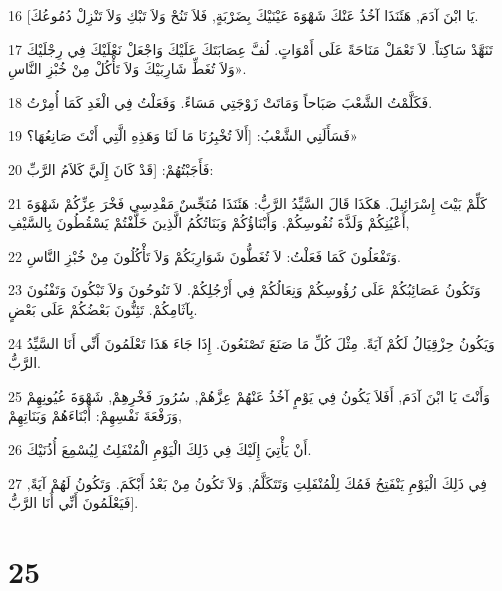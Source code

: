 \par 16 [يَا ابْنَ آدَمَ, هَئَنَذَا آخُذُ عَنْكَ شَهْوَةَ عَيْنَيْكَ بِضَرْبَةٍ, فَلاَ تَنُحْ وَلاَ تَبْكِ وَلاَ تَنْزِلْ دُمُوعُكَ.
\par 17 تَنَهَّدْ سَاكِتاً. لاَ تَعْمَلْ مَنَاحَةً عَلَى أَمْوَاتٍ. لُفَّ عِصَابَتَكَ عَلَيْكَ وَاجْعَلْ نَعْلَيْكَ فِي رِجْلَيْكَ وَلاَ تُغَطِّ شَارِبَيْكَ وَلاَ تَأْكُلْ مِنْ خُبْزِ النَّاسِ».
\par 18 فَكَلَّمْتُ الشَّعْبَ صَبَاحاً وَمَاتَتْ زَوْجَتِي مَسَاءً. وَفَعَلْتُ فِي الْغَدِ كَمَا أُمِرْتُ.
\par 19 فَسَأَلَنِي الشَّعْبُ: [أَلاَ تُخْبِرُنَا مَا لَنَا وَهَذِهِ الَّتِي أَنْتَ صَانِعُهَا؟»
\par 20 فَأَجَبْتُهُمْ: [قَدْ كَانَ إِلَيَّ كَلاَمُ الرَّبِّ:
\par 21 كَلِّمْ بَيْتَ إِسْرَائِيلَ. هَكَذَا قَالَ السَّيِّدُ الرَّبُّ: هَئَنَذَا مُنَجِّسٌ مَقْدِسِي فَخْرَ عِزِّكُمْ شَهْوَةَ أَعْيُنِكُمْ وَلَذَّةَ نُفُوسِكُمْ. وَأَبْنَاؤُكُمْ وَبَنَاتُكُمُ الَّذِينَ خَلَّفْتُمْ يَسْقُطُونَ بِالسَّيْفِ,
\par 22 وَتَفْعَلُونَ كَمَا فَعَلْتُ: لاَ تُغَطُّونَ شَوَارِبَكُمْ وَلاَ تَأْكُلُونَ مِنْ خُبْزِ النَّاسِ.
\par 23 وَتَكُونُ عَصَائِبُكُمْ عَلَى رُؤُوسِكُمْ وَنِعَالُكُمْ فِي أَرْجُلِكُمْ. لاَ تَنُوحُونَ وَلاَ تَبْكُونَ وَتَفْنُونَ بِآثَامِكُمْ. تَئِنُّونَ بَعْضُكُمْ عَلَى بَعْضٍ.
\par 24 وَيَكُونُ حِزْقِيَالُ لَكُمْ آيَةً. مِثْلَ كُلِّ مَا صَنَعَ تَصْنَعُونَ. إِذَا جَاءَ هَذَا تَعْلَمُونَ أَنِّي أَنَا السَّيِّدُ الرَّبُّ.
\par 25 وَأَنْتَ يَا ابْنَ آدَمَ, أَفَلاَ يَكُونُ فِي يَوْمٍ آخُذُ عَنْهُمْ عِزَّهُمْ, سُرُورَ فَخْرِهِمْ, شَهْوَةَ عُيُونِهِمْ وَرَفْعَةَ نَفْسِهِمْ: أَبْنَاءَهُمْ وَبَنَاتِهِمْ,
\par 26 أَنْ يَأْتِيَ إِلَيْكَ فِي ذَلِكَ الْيَوْمِ الْمُنْفَلِتُ لِيُسْمِعَ أُذُنَيْكَ.
\par 27 فِي ذَلِكَ الْيَوْمِ يَنْفَتِحُ فَمُكَ لِلْمُنْفَلِتِ وَتَتَكَلَّمُ, وَلاَ تَكُونُ مِنْ بَعْدُ أَبْكَمَ. وَتَكُونُ لَهُمْ آيَةً, فَيَعْلَمُونَ أَنِّي أَنَا الرَّبُّ].

\chapter{25}

